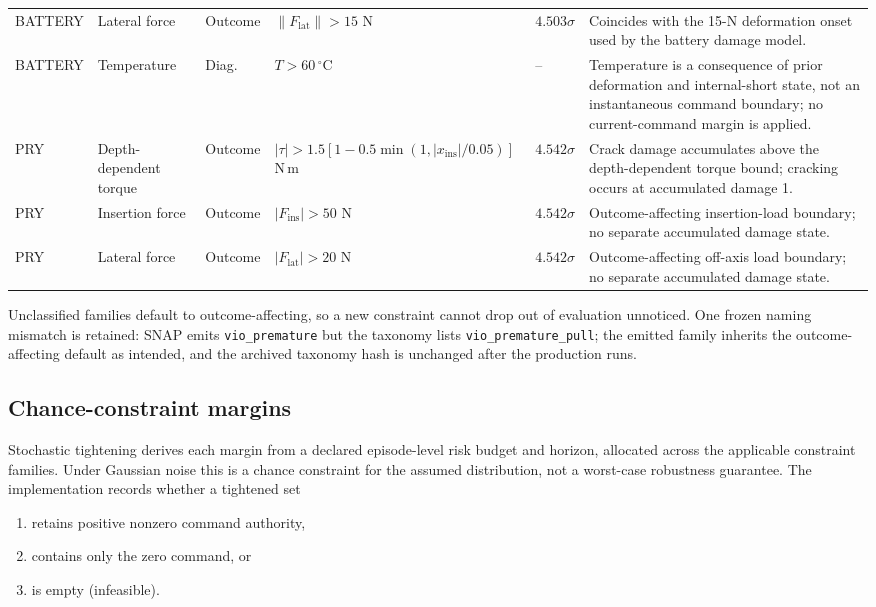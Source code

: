 \documentclass[10pt]{article}
\begin{document}
\begin{longtable}{@{}L{0.60in}L{1.00in}L{0.60in}L{1.35in}L{0.83in}L{1.83in}@{}}
BATTERY &
Lateral force &
Outcome &
$\|F_{\mathrm{lat}}\|>15$ N &
$4.503\sigma$ &
Coincides with the 15-N deformation onset used by the battery damage model.
\\

BATTERY &
Temperature &
Diag. &
$T>60\,^{\circ}\mathrm{C}$ &
-- &
Temperature is a consequence of prior deformation and internal-short state,
not an instantaneous command boundary; no current-command margin is applied.
\\

\midrule

PRY &
Depth-dependent torque &
Outcome &
$|\tau|>
1.5[1-0.5\min(1,|x_{\mathrm{ins}}|/0.05)]$ N\,m &
$4.542\sigma$ &
Crack damage accumulates above the depth-dependent torque bound; cracking
occurs at accumulated damage 1.
\\*

PRY &
Insertion force &
Outcome &
$|F_{\mathrm{ins}}|>50$ N &
$4.542\sigma$ &
Outcome-affecting insertion-load boundary; no separate accumulated damage
state.
\\*

PRY &
Lateral force &
Outcome &
$|F_{\mathrm{lat}}|>20$ N &
$4.542\sigma$ &
Outcome-affecting off-axis load boundary; no separate accumulated damage
state.
\\

\bottomrule
\end{longtable}
\endgroup

Unclassified families default to outcome-affecting, so a new constraint cannot drop out of evaluation unnoticed. One frozen naming mismatch is retained: SNAP emits
\texttt{vio\_premature} but the taxonomy lists
\texttt{vio\_premature\_pull}; the emitted family inherits the
outcome-affecting default as intended, and the archived taxonomy hash is
unchanged after the production runs.


\subsection{Chance-constraint margins}

Stochastic tightening derives each margin from a declared episode-level risk
budget and horizon, allocated across the applicable constraint families. Under
Gaussian noise this is a chance constraint for the assumed distribution, not a
worst-case robustness guarantee. The implementation records whether a
tightened set

\begin{enumerate}
\item retains positive nonzero command authority,
\item contains only the zero command, or
\item is empty (infeasible).
\end{enumerate}
\end{document}

